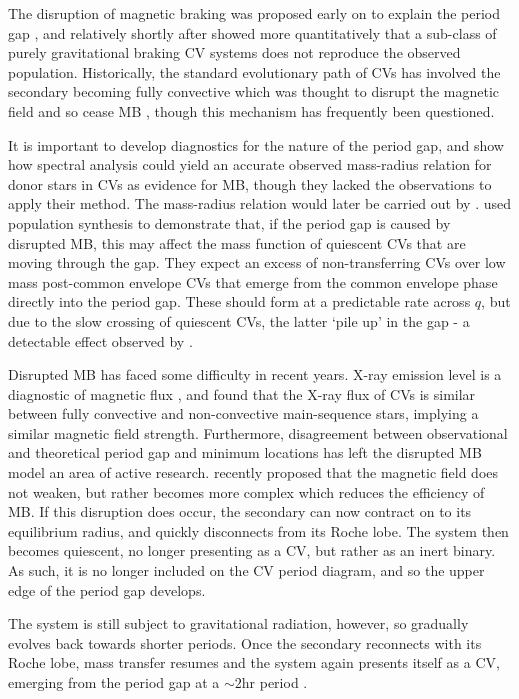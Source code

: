 The disruption of magnetic braking was proposed early on to explain the period gap \citep{rappaport1983, spruit1983}, and relatively shortly after \citet{kolb1993} showed more quantitatively that a sub-class of purely gravitational braking CV systems does not reproduce the observed population. 
Historically, the standard evolutionary path of CVs has involved the secondary becoming fully convective which was thought to disrupt the magnetic field and so cease MB \citep{knigge11}, though this mechanism has frequently been questioned. 

It is important to develop diagnostics for the nature of the period gap, and \citet{smith1998} show how spectral analysis could yield an accurate observed mass-radius relation for donor stars in CVs as evidence for MB, though they lacked the observations to apply their method. The mass-radius relation would later be carried out by \citet{knigge11}.
\citet{Davis2008} used population synthesis to demonstrate that, if the period gap is caused by disrupted MB, this may affect the mass function of quiescent CVs that are moving through the gap. They expect an excess of non-transferring CVs over low mass post-common envelope CVs that emerge from the common envelope phase directly into the period gap. These should form at a predictable rate across $q$, but due to the slow crossing of quiescent CVs, the latter `pile up' in the gap - a detectable effect observed by \citet{zorotovic2011}.

Disrupted MB has faced some difficulty in recent years. X-ray emission level is a diagnostic of magnetic flux \citep{pevtsov2003}, and \citet{wright2016} found that the X-ray flux of CVs is similar between fully convective and non-convective main-sequence stars, implying a similar magnetic field strength. Furthermore, disagreement between observational and theoretical period gap and minimum locations \citep{knigge11} has left the disrupted MB model an area of active research. 
\citet{garraffo2018} recently proposed that the magnetic field does not weaken, but rather becomes more complex which reduces the efficiency of MB. If this disruption does occur, the secondary can now contract on to its equilibrium radius, and quickly disconnects from its Roche lobe. The system then becomes quiescent, no longer presenting as a CV, but rather as an inert binary. As such, it is no longer included on the CV period diagram, and so the upper edge of the period gap develops.

The system is still subject to gravitational radiation, however, so gradually evolves back towards shorter periods. Once the secondary reconnects with its Roche lobe, mass transfer resumes and the system again presents itself as a CV, emerging from the period gap at a $\sim2$hr period \citep{kolb2002}.

